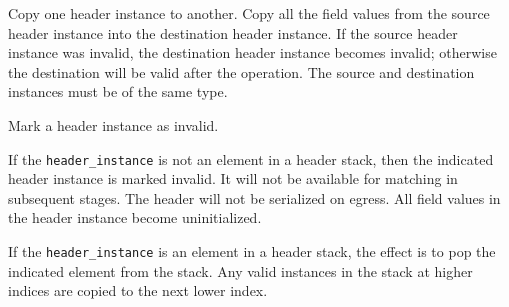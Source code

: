 \documentclass[12pt]{article}
\begin{document}

{ %
Copy one header instance to another.
}
{ %
}
{ %
Copy all the field values from the source header instance into the destination
header instance. If the source header instance was invalid, the destination
header instance becomes invalid; otherwise the destination will be valid
after the operation. The source and destination instances must be of the
same type.
}


{ %
Mark a header instance as invalid.
}
{ %
}
{ %
If the \texttt{header_instance} is not an element in a header stack, then the indicated
header instance is marked invalid. It will not be available for matching in
subsequent \matchaction stages. The header will not be serialized on egress.
All field values in the header instance become uninitialized.

If the \texttt{header_instance} is an element in a header stack, the effect is to
pop the indicated element from the stack. Any valid instances in the stack
at higher indices are copied to the next lower index.
}

\end{document}
